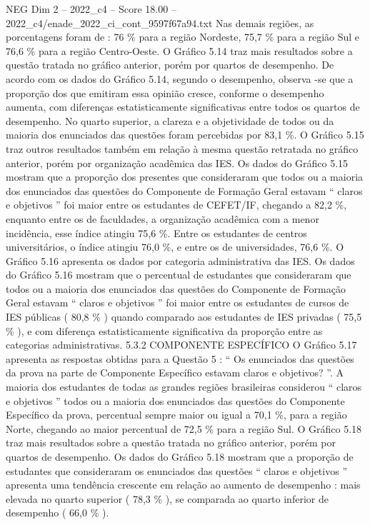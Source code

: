 \begin{textsample}{NEG Dim 2 – 2022\_c4 – Score 18.00 – 2022\_c4/enade\_2022\_ci\_cont\_9597f67a94.txt}
Nas demais regiões, as porcentagens foram de : 76 \% para a região Nordeste, 75,7 \% para a região Sul e 76,6 \% para a região Centro-Oeste.
O Gráfico 5.14 traz mais resultados sobre a questão tratada no gráfico anterior, porém por quartos de desempenho.
De acordo com os dados do Gráfico 5.14, segundo o desempenho, observa -se que a proporção dos que emitiram essa opinião cresce, conforme o desempenho aumenta, com diferenças estatisticamente significativas entre todos os quartos de desempenho.
No quarto superior, a clareza e a objetividade de todos ou da maioria dos enunciados das questões foram percebidas por 83,1 \%.
O Gráfico 5.15 traz outros resultados também em relação à mesma questão retratada no gráfico anterior, porém por organização acadêmica das IES.
Os dados do Gráfico 5.15 mostram que a proporção dos presentes que consideraram que todos ou a maioria dos enunciados das questões do Componente de Formação Geral estavam “ claros e objetivos ” foi maior entre os estudantes de CEFET/IF, chegando a 82,2 \%, enquanto entre os de faculdades, a organização acadêmica com a menor incidência, esse índice atingiu 75,6 \%.
Entre os estudantes de centros universitários, o índice atingiu 76,0 \%, e entre os de universidades, 76,6 \%.
O Gráfico 5.16 apresenta os dados por categoria administrativa das IES.
Os dados do Gráfico 5.16 mostram que o percentual de estudantes que consideraram que todos ou a maioria dos enunciados das questões do Componente de Formação Geral estavam “ claros e objetivos ” foi maior entre os estudantes de cursos de IES públicas ( 80,8 \% ) quando comparado aos estudantes de IES privadas ( 75,5 \% ), e com diferença estatisticamente significativa da proporção entre as categorias administrativas. 5.3.2 COMPONENTE ESPECÍFICO O Gráfico 5.17 apresenta as respostas obtidas para a Questão 5 : “ Os enunciados das questões da prova na parte de Componente Específico estavam claros e objetivos? ”.
A maioria dos estudantes de todas as grandes regiões brasileiras considerou “ claros e objetivos ” todos ou a maioria dos enunciados das questões do Componente Específico da prova, percentual sempre maior ou igual a 70,1 \%, para a região Norte, chegando ao maior percentual de 72,5 \% para a região Sul.
O Gráfico 5.18 traz mais resultados sobre a questão tratada no gráfico anterior, porém por quartos de desempenho.
Os dados do Gráfico 5.18 mostram que a proporção de estudantes que consideraram os enunciados das questões “ claros e objetivos ” apresenta uma tendência crescente em relação ao aumento de desempenho : mais elevada no quarto superior ( 78,3 \% ), se comparada ao quarto inferior de desempenho ( 66,0 \% ).

\end{textsample}
